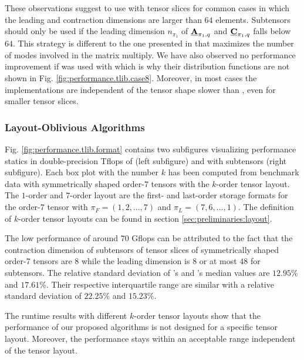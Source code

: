 These observations suggest to use  with tensor slices for common cases in which the leading and contraction dimensions are larger than $64$ elements.
Subtensors should only be used if the leading dimension $n_{\pi_1}$ of $\underline{\mathbf{A}}_{\pi_1,q}$ and $\underline{\mathbf{C}}_{\pi_1,q}$ falls below $64$.
This strategy is different to the one presented in \cite{li:2015:input} that maximizes the number of modes involved in the matrix multiply.
We have also observed no performance improvement if  was used with  which is why their distribution functions are not shown in Fig. \ref{fig:performance.tlib.case8}.
Moreover, in most cases the  implementations are independent of the tensor shape slower than , even for smaller tensor slices.
\vspace{-1em}

\subsubsection{Layout-Oblivious Algorithms}
Fig. \ref{fig:performance.tlib.format} contains two subfigures visualizing performance statics in double-precision Tflops of  (left subfigure) and  with subtensors (right subfigure).
Each box plot with the number $k$ has been computed from benchmark data with symmetrically shaped order-$7$ tensors with the $k$-order tensor layout.
The $1$-order and $7$-order layout are the first- and last-order storage formats for the order-$7$ tensor with $\pi_F=(1,2,...,7)$ and $\pi_L= (7,6,...,1)$.
The definition of $k$-order tensor layouts can be found in section \ref{sec:preliminaries:layout}.

The low performance of around $70$ Gflops can be attributed to the fact that the contraction dimension of subtensors of tensor slices of symmetrically shaped order-7 tensors are $8$ while the leading dimension is $8$ or at most $48$ for subtensors.
The relative standard deviation of 's and 's median values are $12.95$\% and $17.61$\%.
Their respective interquartile range are similar with a relative standard deviation of $22.25$\% and $15.23$\%.

The runtime results with different $k$-order tensor layouts show that the performance of our proposed algorithms is not designed for a specific tensor layout.
Moreover, the performance stays within an acceptable range independent of the tensor layout.
\vspace{-1em}

